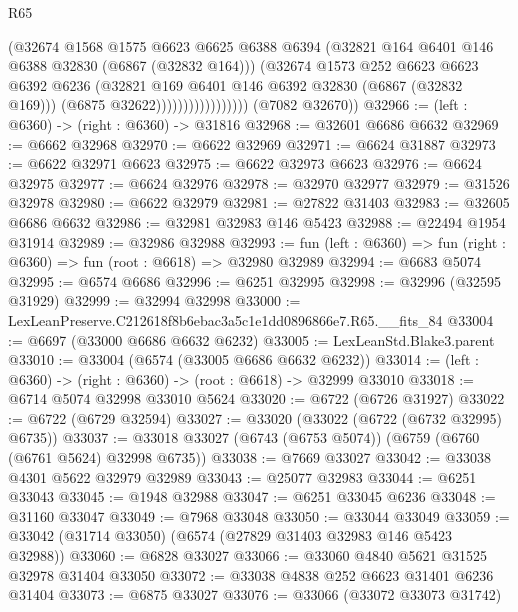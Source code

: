 \begin{lexlean}{R65}
\begin{coremodule}
{                                  (@32674
                                    @1568
                                    @1575
                                    @6623
                                    @6625
                                    @6388
                                    @6394
                                    (@32821 @164 @6401 @146 @6388 @32830 (@6867 (@32832 @164)))
                                    (@32674
                                      @1573
                                      @252
                                      @6623
                                      @6623
                                      @6392
                                      @6236
                                      (@32821 @169 @6401 @146 @6392 @32830 (@6867 (@32832 @169)))
                                      (@6875 @32622)))))))))))))))))
      (@7082 @32670))
@32966 := (left : @6360) -> (right : @6360) -> @31816
@32968 := @32601 @6686 @6632
@32969 := @6662 @32968
@32970 := @6622 @32969
@32971 := @6624 @31887
@32973 := @6622 @32971 @6623
@32975 := @6622 @32973 @6623
@32976 := @6624 @32975
@32977 := @6624 @32976
@32978 := @32970 @32977
@32979 := @31526 @32978
@32980 := @6622 @32979
@32981 := @27822 @31403
@32983 := @32605 @6686 @6632
@32986 := @32981 @32983 @146 @5423
@32988 := @22494 @1954 @31914
@32989 := @32986 @32988
@32993 := fun (left : @6360) => fun (right : @6360) => fun (root : @6618) => @32980 @32989
@32994 := @6683 @5074
@32995 := @6574 @6686
@32996 := @6251 @32995
@32998 := @32996 (@32595 @31929)
@32999 := @32994 @32998
@33000 := LexLeanPreserve.C212618f8b6ebac3a5c1e1dd0896866e7.R65.__fits_84
@33004 := @6697 (@33000 @6686 @6632 @6232)
@33005 := LexLeanStd.Blake3.parent
@33010 := @33004 (@6574 (@33005 @6686 @6632 @6232))
@33014 := (left : @6360) -> (right : @6360) -> (root : @6618) -> @32999 @33010
@33018 := @6714 @5074 @32998 @33010 @5624
@33020 := @6722 (@6726 @31927)
@33022 := @6722 (@6729 @32594)
@33027 := @33020 (@33022 (@6722 (@6732 @32995) @6735))
@33037 := @33018 @33027 (@6743 (@6753 @5074)) (@6759 (@6760 (@6761 @5624) @32998 @6735))
@33038 := @7669 @33027
@33042 := @33038 @4301 @5622 @32979 @32989
@33043 := @25077 @32983
@33044 := @6251 @33043
@33045 := @1948 @32988
@33047 := @6251 @33045 @6236
@33048 := @31160 @33047
@33049 := @7968 @33048
@33050 := @33044 @33049
@33059 := @33042 (@31714 @33050) (@6574 (@27829 @31403 @32983 @146 @5423 @32988))
@33060 := @6828 @33027
@33066 := @33060 @4840 @5621 @31525 @32978 @31404 @33050
@33072 := @33038 @4838 @252 @6623 @31401 @6236 @31404
@33073 := @6875 @33027
@33076 := @33066 (@33072 @33073 @31742)
}
\end{coremodule}
\end{lexlean}
